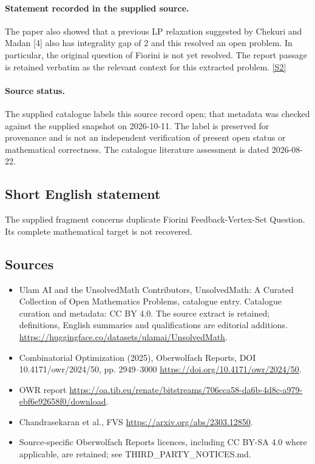 \documentclass[11pt]{article}
\newcommand{\sref}[2]{\hyperlink{source:#1:#2}{[S#2]}}
\begin{document}
\paragraph{Statement recorded in the supplied source.}
The paper also showed that a previous LP relaxation suggested by Chekuri and Madan [4] also has integrality gap of 2 and this resolved an open problem. In particular, the original question of Fiorini is not yet resolved. The report passage is retained verbatim as the relevant context for this extracted problem. \sref{statement}{2}
\paragraph{Source status.}
The supplied catalogue labels this source record open; that metadata was checked against the supplied snapshot on 2026-10-11. The label is preserved for provenance and is not an independent verification of present open status or mathematical correctness. The catalogue literature assessment is dated 2026-08-22.
\subsection{Short English statement}
The supplied fragment concerns duplicate Fiorini Feedback-Vertex-Set Question. Its complete mathematical target is not recovered.
\subsection{Sources}
\begin{itemize}
\item[\hypertarget{source:statement:1}{S1}] Ulam AI and the UnsolvedMath Contributors, UnsolvedMath: A Curated Collection of Open Mathematics Problems, catalogue entry. Catalogue curation and metadata: CC BY 4.0. The source extract is retained; definitions, English summaries and qualifications are editorial additions.
\url{https://huggingface.co/datasets/ulamai/UnsolvedMath}.
\item[\hypertarget{source:statement:2}{S2}] Combinatorial Optimization (2025), Oberwolfach Reports, DOI 10.4171/owr/2024/50, pp. 2949--3000
\url{https://doi.org/10.4171/owr/2024/50}.
\item[\hypertarget{source:statement:3}{S3}] OWR report
\url{https://oa.tib.eu/renate/bitstreams/706cca58-da6b-4d8c-a979-ebf6e92658f0/download}.
\item[\hypertarget{source:statement:4}{S4}] Chandrasekaran et al., FVS
\url{https://arxiv.org/abs/2303.12850}.
\item Source-specific Oberwolfach Reports licences, including CC BY-SA 4.0 where applicable, are retained; see THIRD\_PARTY\_NOTICES.md.
\end{itemize}
\end{document}
